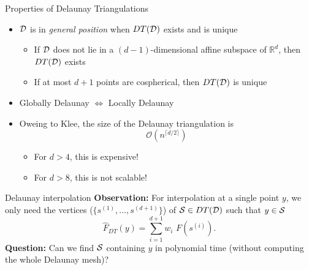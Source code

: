 \documentclass[xcolor=dvipsnames]{beamer}
\begin{document}
\begin{frame}{Properties of Delaunay Triangulations}
\begin{itemize}
\item ${\cal D}$ is in {\it general position} when $DT({\cal D})$ exists and
is unique
\begin{itemize}
\item If ${\cal D}$ does not lie in a $(d-1)$-dimensional affine
subspace of $\mathbb{R}^d$, then $DT({\cal D})$ exists
\item If at most $d+1$ points are cospherical, then $DT({\cal D})$ is unique
\end{itemize}
\item Globally Delaunay $\iff$ Locally Delaunay
\item Oweing to Klee, the size of the Delaunay triangulation is
$$
\mathcal{O}\left(n^{\lceil d/2 \rceil}\right)
$$
\pause
\begin{itemize}
\item For $d > 4$, this is expensive!
\item For $d > 8$, this is not scalable!
\end{itemize}
\end{itemize}
\end{frame}
\begin{frame}{Delaunay interpolation}
\textbf{Observation:}
For interpolation at a single point $y$, we only need the
vertices ($\{s^{(1)}, \ldots, s^{(d+1)}\}$) of ${\cal S} \in DT({\cal D})$
such that $y\in {\cal S}$
$$
{\hat F}_{DT}(y) = \sum_{i=1}^{d+1} w_i\text{~}F(s^{(i)}).
$$
\medskip
\textbf{Question:}
Can we find ${\cal S}$ containing $y$ in polynomial time (without computing
the whole Delaunay mesh)?
\end{frame}
\end{document}
